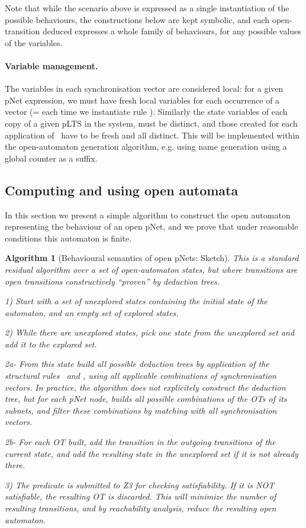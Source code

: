 \documentclass{lncs/llncs}
\newcommand{\TODO}[1]{\textcolor{red}{\textbf{[TODO:#1]}}}
\newcommand{\ERIC}[1]{\textcolor{blue}{#1}}
\newtheorem{algorithm}[theorem]{Algorithm}
\begin{document}
Note that while the scenario above is expressed as a single
instantiation of the possible behaviours, the constructions below are
kept symbolic, and each open-transition deduced expresses a whole family of
behaviours, for any possible values of the variables.

\paragraph{Variable management.}
The variables in each synchronisation vector are considered local:
for a given pNet expression, we must have fresh local variables for
each occurrence of a vector (= each time we instantiate rule
\TrDeux). Similarly the state variables of each copy of a
given pLTS in the system, must be distinct, and those created for each
application of \TrDeux\ have to be fresh and all distinct. 
This will be implemented within the open-automaton generation algorithm,
e.g. using name generation using a global counter as a suffix.



\subsection{Computing and using open automata}
In this section we present a simple algorithm to construct the open
automaton representing the behaviour of an open pNet, and we prove that
under reasonable conditions this automaton is finite.


\begin{algorithm}[Behavioural semantics of open pNets: Sketch]
This is a standard residual algorithm over a set of open-automaton
states, but where transitions are open transitions
constructively ``proven'' by deduction trees.

1) Start with a set of unexplored states containing the initial state
of the automaton, and an empty set of explored states.

2) While there are unexplored states, pick one state from the
unexplored set and add it to the explored set.

2a- From this state
build all possible deduction trees by application of the structural
rules \TrUn\ and \TrDeux, using all applicable combinations
of synchronisation vectors.
In practice, the algorithm does not explicitely construct the
deduction tree, but for each pNet node, builds all possible
combinations of the OTs of its subnets, and filter these combinations
by matching with all synchronisation vectors. 
 
2b- For each OT built, add the transition in the
outgoing transitions of the current state, and add the
resulting state in the unexplored set if it is not already there.

3) The predicate is submitted to Z3 for checking satisfiability. If it
is NOT satisfiable, the resulting OT is discarded. This will minimize
the number of resulting transitions, and by reachability analysis,
reduce the resulting open automaton.

\end{algorithm}
\end{document}
